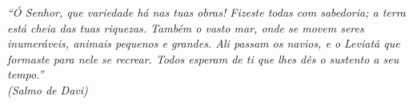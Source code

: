 \begin{epigrafe}
	\vspace*{\fill}
	\begin{flushright}
		\textit{``Ó Senhor, que variedade há nas tuas obras! Fizeste todas com sabedoria; a terra está cheia das tuas riquezas.
		Também o vasto mar, onde se movem seres inumeráveis, animais pequenos e grandes.
		Ali passam os navios, e o Leviatã que formaste para nele se recrear.
		Todos esperam de ti que lhes dês o sustento a seu tempo.''\\
			(Salmo de Davi)}
	\end{flushright}
\end{epigrafe}


\setlength{\absparsep}{18pt} %
